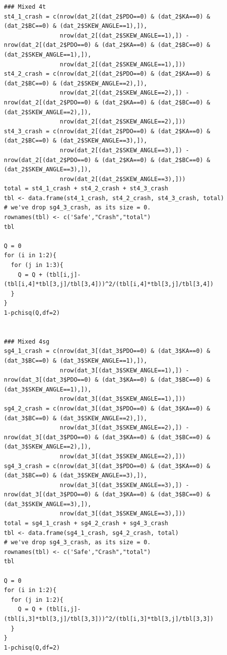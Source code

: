\documentclass[11pt]{scrartcl} %
\begin{document}
\begin{lstlisting}
### Mixed 4t
st4_1_crash = c(nrow(dat_2[(dat_2$PDO==0) & (dat_2$KA==0) & (dat_2$BC==0) & (dat_2$SKEW_ANGLE==1),]),
                nrow(dat_2[(dat_2$SKEW_ANGLE==1),]) - nrow(dat_2[(dat_2$PDO==0) & (dat_2$KA==0) & (dat_2$BC==0) & (dat_2$SKEW_ANGLE==1),]),
                nrow(dat_2[(dat_2$SKEW_ANGLE==1),]))
st4_2_crash = c(nrow(dat_2[(dat_2$PDO==0) & (dat_2$KA==0) & (dat_2$BC==0) & (dat_2$SKEW_ANGLE==2),]),
                nrow(dat_2[(dat_2$SKEW_ANGLE==2),]) - nrow(dat_2[(dat_2$PDO==0) & (dat_2$KA==0) & (dat_2$BC==0) & (dat_2$SKEW_ANGLE==2),]),
                nrow(dat_2[(dat_2$SKEW_ANGLE==2),]))
st4_3_crash = c(nrow(dat_2[(dat_2$PDO==0) & (dat_2$KA==0) & (dat_2$BC==0) & (dat_2$SKEW_ANGLE==3),]),
                nrow(dat_2[(dat_2$SKEW_ANGLE==3),]) - nrow(dat_2[(dat_2$PDO==0) & (dat_2$KA==0) & (dat_2$BC==0) & (dat_2$SKEW_ANGLE==3),]),
                nrow(dat_2[(dat_2$SKEW_ANGLE==3),]))
total = st4_1_crash + st4_2_crash + st4_3_crash
tbl <- data.frame(st4_1_crash, st4_2_crash, st4_3_crash, total)
# we've drop sg4_3_crash, as its size = 0.
rownames(tbl) <- c('Safe',"Crash","total")
tbl

Q = 0
for (i in 1:2){
  for (j in 1:3){
    Q = Q + (tbl[i,j]-(tbl[i,4]*tbl[3,j]/tbl[3,4]))^2/(tbl[i,4]*tbl[3,j]/tbl[3,4])
  }
}
1-pchisq(Q,df=2)


### Mixed 4sg
sg4_1_crash = c(nrow(dat_3[(dat_3$PDO==0) & (dat_3$KA==0) & (dat_3$BC==0) & (dat_3$SKEW_ANGLE==1),]),
                nrow(dat_3[(dat_3$SKEW_ANGLE==1),]) - nrow(dat_3[(dat_3$PDO==0) & (dat_3$KA==0) & (dat_3$BC==0) & (dat_3$SKEW_ANGLE==1),]),
                nrow(dat_3[(dat_3$SKEW_ANGLE==1),]))
sg4_2_crash = c(nrow(dat_3[(dat_3$PDO==0) & (dat_3$KA==0) & (dat_3$BC==0) & (dat_3$SKEW_ANGLE==2),]),
                nrow(dat_3[(dat_3$SKEW_ANGLE==2),]) - nrow(dat_3[(dat_3$PDO==0) & (dat_3$KA==0) & (dat_3$BC==0) & (dat_3$SKEW_ANGLE==2),]),
                nrow(dat_3[(dat_3$SKEW_ANGLE==2),]))
sg4_3_crash = c(nrow(dat_3[(dat_3$PDO==0) & (dat_3$KA==0) & (dat_3$BC==0) & (dat_3$SKEW_ANGLE==3),]),
                nrow(dat_3[(dat_3$SKEW_ANGLE==3),]) - nrow(dat_3[(dat_3$PDO==0) & (dat_3$KA==0) & (dat_3$BC==0) & (dat_3$SKEW_ANGLE==3),]),
                nrow(dat_3[(dat_3$SKEW_ANGLE==3),]))
total = sg4_1_crash + sg4_2_crash + sg4_3_crash
tbl <- data.frame(sg4_1_crash, sg4_2_crash, total)
# we've drop sg4_3_crash, as its size = 0.
rownames(tbl) <- c('Safe',"Crash","total")
tbl

Q = 0
for (i in 1:2){
  for (j in 1:2){
    Q = Q + (tbl[i,j]-(tbl[i,3]*tbl[3,j]/tbl[3,3]))^2/(tbl[i,3]*tbl[3,j]/tbl[3,3])
  }
}
1-pchisq(Q,df=2)


\end{lstlisting}
\end{document}

